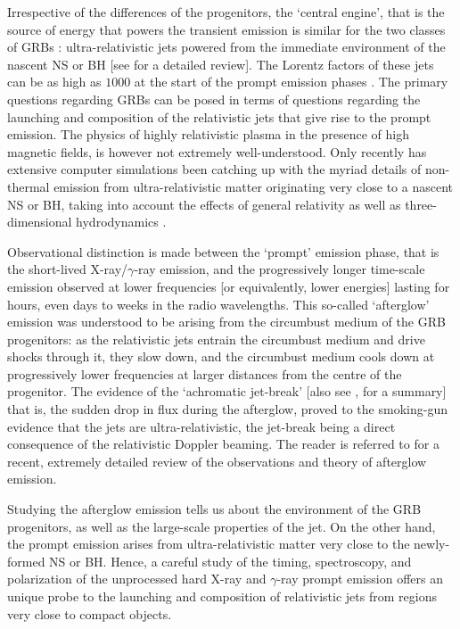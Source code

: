 Irrespective of the differences of the progenitors, the `central engine', that is the source of energy that powers the transient emission is similar for the two classes of GRBs \citep{Ghirlanda_et_al.-2009-A&A, Calderone_et_al.-2015-MNRAS}: ultra-relativistic jets powered from the immediate environment of the nascent NS or BH [see \cite{Kumar_and_Zhang-2015-PhR} for a detailed review]. The Lorentz factors of these jets can be as high as $1000$ at the start of the prompt emission phases \citep{Abdo_et_al.-2009-Science}. The primary questions regarding GRBs can be posed in terms of questions regarding the launching and composition of the relativistic jets that give rise to the prompt emission. The physics of highly relativistic plasma in the presence of high magnetic fields, is however not extremely well-understood. Only recently has extensive computer simulations been catching up with the myriad details of non-thermal emission from ultra-relativistic matter originating very close to a nascent NS or BH, taking into account the effects of general relativity as well as three-dimensional hydrodynamics \citep{Sasha_et_al.-2008-MNRAS, Sasha_et_Al.-2010-NewA, Narayan_et_al.-2011-MNRAS}.

Observational distinction is made between the `prompt' emission phase, that is the short-lived X-ray/$\gamma$-ray emission, and the progressively longer time-scale emission observed at lower frequencies [or equivalently, lower energies] lasting for hours, even days to weeks in the radio wavelengths. This so-called `afterglow' emission was understood to be arising from the circumbust medium of the GRB progenitors: as the relativistic jets entrain the circumbust medium and drive shocks through it, they slow down, and the circumbust medium cools down at progressively lower frequencies at larger distances from the centre of the progenitor. The evidence of the `achromatic jet-break' \citep{Fruchter_et_al.-1999-ApJ, Kulkarni_et_al.-1999-Nature, Stanek_et_al.-1999-ApJ, Harrison_et_al.-1999-ApJ, Frail_et_al.-2001-ApJ} [also see \cite{Fong_et_al.-2012-ApJ}, \cite{Fong_et_al.-2015-ApJ} for a summary] that is, the sudden drop in flux during the afterglow, proved to the smoking-gun evidence that the jets are ultra-relativistic, the jet-break being a direct consequence of the relativistic Doppler beaming. The reader is referred to \cite{Kumar_and_Zhang-2015-PhR} for a recent, extremely detailed review of the observations and theory of afterglow emission.

Studying the afterglow emission tells us about the environment of the GRB progenitors, as well as the large-scale properties of the jet. On the other hand, the prompt emission arises from ultra-relativistic matter very close to the newly-formed NS or BH. Hence, a careful study of the timing, spectroscopy, and polarization of the unprocessed hard X-ray and $\gamma$-ray prompt emission offers an unique probe to the launching and composition of relativistic jets from regions very close to compact objects.

